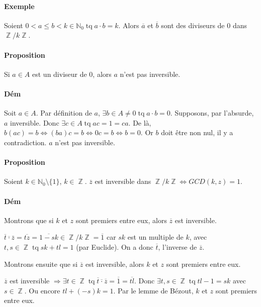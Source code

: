 \documentclass{article}
\DeclareMathOperator{\tq}{\text{ tq }}
\DeclareMathOperator{\Z}{\mathbb Z}
\begin{document}
			\paragraph{Exemple} Soient $0 < a \leq b < k \in \mathbb N_0 \tq a \cdot b = k$. Alors $\overline a$ et $\overline b$ sont des diviseurs
			de 0 dans $\Z/k\Z$.

			\paragraph{Proposition} Si $a \in A$ est un diviseur de 0, alors $a$ n'est pas inversible.

			\paragraph{Dém} Soit $a \in A$. Par définition de $a$, $\exists b \in A \neq 0 \tq a \cdot b = 0$.
			Supposons, par l'absurde, $a$ inversible. Donc $\exists c \in A \tq ac = 1 = ca$. De là, $b(ac) = b \iff (ba)c = b \iff 0c = b \iff b = 0$.
			Or $b$ doit être non nul, il y a contradiction. $a$ n'est pas inversible.

			\paragraph{Proposition} Soient $k \in \mathbb N_0 \setminus \{1\}$, $k \in \Z$. $\overline z$ est inversible dans $\Z/k\Z \iff GCD(k, z) = 1$.
			
			\paragraph{Dém} Montrons que si $k$ et $z$ sont premiers entre eux, alors $\overline z$ est inversible.
			
			$\overline{t} \overline{\cdot} \overline{z} = \overline{tz} = \overline{1-sk} \in\Z / k\Z = \overline 1$ car $sk$ est un multiple de $k$, avec $t, s \in \Z \tq
			sk + tl = 1$ (par Euclide). On a donc $\overline t$, l'inverse de $\overline z$.
			
			Montrons ensuite que si $\overline z$ est inversible, alors $k$ et $z$ sont premiers entre eux.
			
			$\overline z$ est inversible $\Rightarrow \exists t \in \Z \tq \overline t \overline \cdot \overline z = \overline 1 = \overline{tl}$. Donc $\exists t, s \in \Z
			\tq tl - 1 = sk$ avec $s \in \Z$. Ou encore $tl + (-s)k = 1$. Par le lemme de Bézout, $k$ et $z$ sont premiers entre eux.
			
\end{document}
